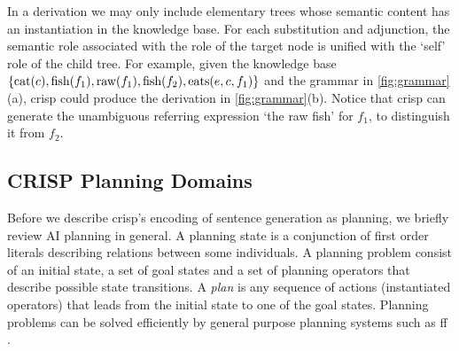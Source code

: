 In a derivation we may only include elementary trees whose semantic content has an instantiation in the knowledge base. For each substitution and adjunction, the semantic role associated with the role of the target node is unified with the `self' role of the child tree. For example, given the knowledge base $\{\mbox{cat}(c), \mbox{fish}(f_1), \mbox{raw}(f_1), \mbox{fish}(f_2), \mbox{eats}(e,c,f_1)\}$ and the grammar in \ref{fig:grammar}(a), {\sc crisp} could produce the derivation in \ref{fig:grammar}(b). Notice that {\sc crisp} can generate the unambiguous referring expression `the raw fish' for $f_1$, to distinguish it from $f_2$. 


\subsection{CRISP Planning Domains} 
\label{ssec:crispdomain}
Before we describe {\sc crisp}'s encoding of sentence generation as planning, we briefly review AI planning in general.  A planning state is a conjunction of first order literals describing relations between some individuals. A planning problem consist of an initial state, a set of goal states and a set of planning operators that describe possible state transitions.  A \emph{plan} is any sequence of actions (instantiated operators) that leads from the initial state to one of the goal states. Planning problems can be solved efficiently by general purpose planning systems such as {\sc ff} \cite{hoffmannnebel2001}.
     

